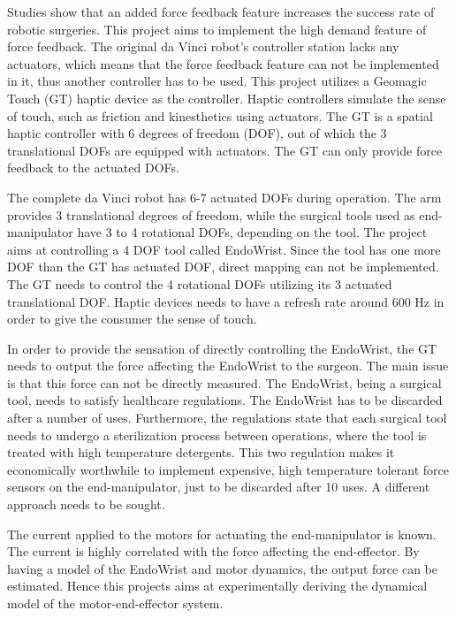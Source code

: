  Studies show that an added force feedback feature increases the success rate of robotic surgeries\cite{lack_fb}. This project aims to implement the high demand feature of force feedback. The original da Vinci robot's controller station lacks any actuators, which means that the force feedback feature can not be implemented in it, thus another controller has to be used. This project utilizes a Geomagic Touch (GT) haptic device as the controller. Haptic controllers simulate the sense of touch, such as friction and kinesthetics using actuators.
The GT is a spatial haptic controller with 6 degrees of freedom (DOF), out of which the 3 translational DOFs are equipped with actuators\cite{gt_spec}. The GT can only provide force feedback to the actuated DOFs.

The complete da Vinci robot has 6-7 actuated DOFs during operation. The arm provides 3 translational degrees of freedom, while the surgical tools used as end-manipulator have 3 to 4 rotational DOFs, depending on the tool. The project aims at controlling a 4 DOF tool called EndoWrist. Since the tool has one more DOF than the GT has actuated DOF, direct mapping can not be implemented. The GT needs to control the 4 rotational DOFs utilizing its 3 actuated translational DOF. Haptic devices needs to have a refresh rate around 600 Hz in order to give the consumer the sense of touch\cite{coles2011role}.%

In order to provide the sensation of directly controlling the EndoWrist, the GT needs to output the force affecting the EndoWrist to the surgeon. The main issue is that this force can not be directly measured. The EndoWrist, being a surgical tool, needs to satisfy healthcare regulations. The EndoWrist has to be discarded after a number of uses. Furthermore, the regulations state that each surgical tool needs to undergo a sterilization process between operations, where the tool is treated with high temperature detergents. This two regulation makes it economically worthwhile to implement expensive, high temperature tolerant force sensors on the end-manipulator, just to be discarded after 10 uses. A different approach needs to be sought.

The current applied to the motors for actuating the end-manipulator is known. The current is highly correlated with the force affecting the end-effector. By having a model of the EndoWrist and motor dynamics, the output force can be estimated. Hence this projects aims at experimentally deriving the dynamical model of the motor-end-effector system.

